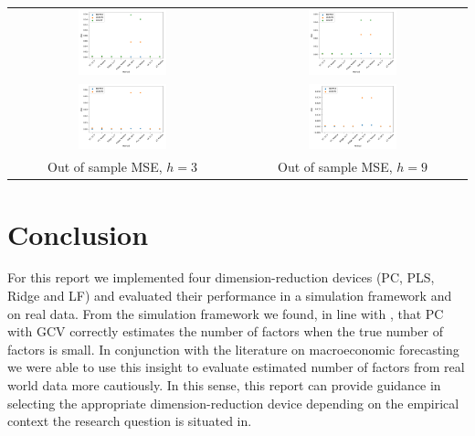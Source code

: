 \begin{table}[h!]
    \centering
    \begin{tabular}{c c}
        \includegraphics[width=0.4\textwidth]{figures/MSE_oos_h3.png} & \includegraphics[width=0.4\textwidth]{figures/MSE_oos_h9.png} \\
        \includegraphics[width=0.4\textwidth]{figures/MSE_oos_h3_noHOUST.png} &
        \includegraphics[width=0.4\textwidth]{figures/MSE_oos_h9_noHOUST.png} \\
        Out of sample MSE, $h = 3$ & Out of sample MSE, $h = 9$
    \end{tabular}
\end{table}

\section{Conclusion}
For this report we implemented four dimension-reduction devices (PC, PLS, Ridge and LF) and evaluated their performance in a simulation framework and on real data. From the simulation framework we found, in line with \citeauthor{carrasco2016sample}, that PC with GCV correctly estimates the number of factors when the true number of factors is small. In conjunction with the literature on macroeconomic forecasting we were able to use this insight to evaluate estimated number of factors from real world data more cautiously. In this sense, this report can provide guidance in selecting the appropriate dimension-reduction device depending on the empirical context the research question is situated in. 

